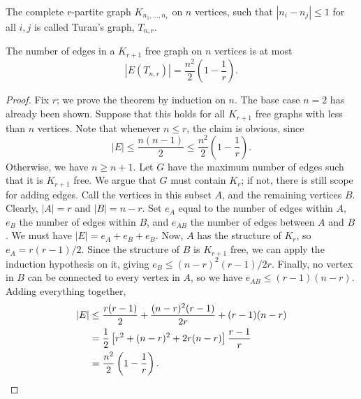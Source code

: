 \documentclass[11pt]{article}
\theoremstyle{definition}
\theoremstyle{remark}
\numberwithin{equation}{section}
\begin{document}
    \begin{definition}
        The complete $r$-partite graph $K_{n_1, \dots, n_r}$ on $n$ vertices, such
        that $|n_i - n_j| \leq 1$ for all $i, j$ is called Turan's graph, $T_{n, r}$.
    \end{definition}

    \begin{theorem}
        The number of edges in a $K_{r + 1}$ free graph on $n$ vertices is at most \[
            |E(T_{n, r})| = \frac{n^2}{2} \left(1 - \frac{1}{r}\right).
        \]
    \end{theorem}
    \begin{proof}
        Fix $r$; we prove the theorem by induction on $n$. The base case $n = 2$ has
        already been shown. Suppose that this holds for all $K_{r + 1}$ free graphs
        with less than $n$ vertices. Note that whenever $n \leq r$, the claim is
        obvious, since \[
            |E| \leq \frac{n (n - 1)}{2} \leq \frac{n^2}{2}\left(1 -
            \frac{1}{r}\right).
        \] Otherwise, we have $n \geq n + 1$. Let $G$ have the maximum number of
        edges such that it is $K_{r + 1}$ free. We argue that $G$ must contain $K_r$;
        if not, there is still scope for adding edges. Call the vertices in this
        subset $A$, and the remaining vertices $B$. Clearly, $|A| = r$ and $|B| = n -
        r$. Set $e_A$ equal to the number of edges within $A$, $e_B$ the number of
        edges within $B$, and $e_{AB}$ the number of edges between $A$ and $B$. We
        must have $|E| = e_A + e_B + e_B$. Now, $A$ has the structure of $K_r$, so
        $e_A = r(r - 1) / 2$. Since the structure of $B$ is $K_{r + 1}$ free, we can
        apply the induction hypothesis on it, giving $e_{B} \leq (n - r)^2(r - 1) /
        2r$. Finally, no vertex in $B$ can be connected to every vertex in $A$, so we
        have $e_{AB} \leq (r - 1)(n - r)$. Adding everything together, 
        \begin{align*}
            |E| &\leq \frac{r (r - 1)}{2} + \frac{(n - r)^2(r - 1)}{2r} + (r - 1)(n -
            r) \\
            &= \frac{1}{2} \left[r^2 + (n - r)^2 + 2r(n - r)\right]\frac{r - 1}{r} \\
            &= \frac{n^2}{2}\left(1 - \frac{1}{r}\right). \qedhere
        \end{align*}
    \end{proof}
\end{document}
